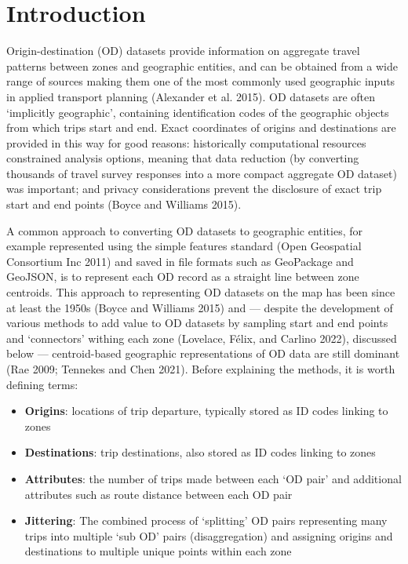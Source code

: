 \documentclass{isprs} %
\begin{document}
\hypertarget{introduction}{%
\section{Introduction}\label{introduction}}

Origin-destination (OD) datasets provide information on aggregate travel patterns between zones and geographic entities, and can be obtained from a wide range of sources making them one of the most commonly used geographic inputs in applied transport planning (Alexander et al. 2015).
OD datasets are often `implicitly geographic', containing identification codes of the geographic objects from which trips start and end.
Exact coordinates of origins and destinations are provided in this way for good reasons: historically computational resources constrained analysis options, meaning that data reduction (by converting thousands of travel survey responses into a more compact aggregate OD dataset) was important; and privacy considerations prevent the disclosure of exact trip start and end points (Boyce and Williams 2015).

A common approach to converting OD datasets to geographic entities, for example represented using the simple features standard (Open Geospatial Consortium Inc 2011) and saved in file formats such as GeoPackage and GeoJSON, is to represent each OD record as a straight line between zone centroids.
This approach to representing OD datasets on the map has been since at least the 1950s (Boyce and Williams 2015) and --- despite the development of various methods to add value to OD datasets by sampling start and end points and `connectors' withing each zone (Lovelace, Félix, and Carlino 2022), discussed below --- centroid-based geographic representations of OD data are still dominant (Rae 2009; Tennekes and Chen 2021).
Before explaining the methods, it is worth defining terms:

\begin{itemize}
\item
  \textbf{Origins}: locations of trip departure, typically stored as ID codes linking to zones
\item
  \textbf{Destinations}: trip destinations, also stored as ID codes linking to zones
\item
  \textbf{Attributes}: the number of trips made between each `OD pair' and additional attributes such as route distance between each OD pair
\item
  \textbf{Jittering}: The combined process of `splitting' OD pairs representing many trips into multiple `sub OD' pairs (disaggregation) and assigning origins and destinations to multiple unique points within each zone
\end{itemize}
\end{document}
